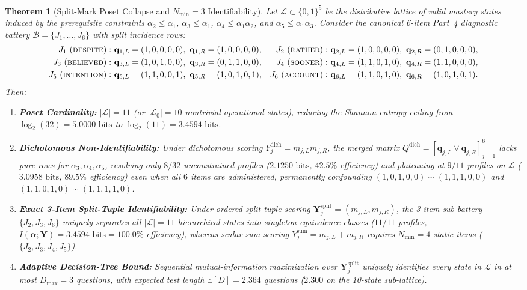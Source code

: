 \documentclass[11pt,reqno]{article}
\newtheorem{theorem}{Theorem}[section]
\begin{document}
\begin{theorem}[Split-Mark Poset Collapse and $N_{\min}=3$ Identifiability]\label{thm:poset}
Let $\mathcal{L} \subset \{0,1\}^5$ be the distributive lattice of valid mastery states induced by the prerequisite constraints $\alpha_2 \le \alpha_1$, $\alpha_3 \le \alpha_1$, $\alpha_4 \le \alpha_1\alpha_2$, and $\alpha_5 \le \alpha_1\alpha_3$. Consider the canonical 6-item Part~4 diagnostic battery $\mathcal{B} = \{J_1,\dots,J_6\}$ with split incidence rows:
\begin{align*}
J_1\ (\textsc{despite}): &\ \mathbf{q}_{1,L}=(1,0,0,0,0),\ \mathbf{q}_{1,R}=(1,0,0,0,0), &
J_2\ (\textsc{rather}):  &\ \mathbf{q}_{2,L}=(1,0,0,0,0),\ \mathbf{q}_{2,R}=(0,1,0,0,0), \\
J_3\ (\textsc{believed}):&\ \mathbf{q}_{3,L}=(1,0,1,0,0),\ \mathbf{q}_{3,R}=(0,1,1,0,0), &
J_4\ (\textsc{sooner}):  &\ \mathbf{q}_{4,L}=(1,1,0,1,0),\ \mathbf{q}_{4,R}=(1,1,0,0,0), \\
J_5\ (\textsc{intention}):&\ \mathbf{q}_{5,L}=(1,1,0,0,1),\ \mathbf{q}_{5,R}=(1,0,1,0,1), &
J_6\ (\textsc{account}): &\ \mathbf{q}_{6,L}=(1,1,0,1,0),\ \mathbf{q}_{6,R}=(1,0,1,0,1).
\end{align*}
Then:
\begin{enumerate}
    \item \textbf{Poset Cardinality:} $|\mathcal{L}| = 11$ (or $|\mathcal{L}_0| = 10$ nontrivial operational states), reducing the Shannon entropy ceiling from $\log_2(32) = 5.0000\text{ bits}$ to $\log_2(11) = 3.4594\text{ bits}$.
    \item \textbf{Dichotomous Non-Identifiability:} Under dichotomous scoring $Y_j^{\mathrm{dich}} = m_{j,L}m_{j,R}$, the merged matrix $Q^{\mathrm{dich}} = [\mathbf{q}_{j,L}\vee\mathbf{q}_{j,R}]_{j=1}^6$ lacks pure rows for $\alpha_3, \alpha_4, \alpha_5$, resolving only $8/32$ unconstrained profiles ($2.1250\text{ bits}$, $42.5\%$ efficiency) and plateauing at $9/11$ profiles on $\mathcal{L}$ ($3.0958\text{ bits}$, $89.5\%$ efficiency) even when all $6$ items are administered, permanently confounding $(1,0,1,0,0) \sim (1,1,1,0,0)$ and $(1,1,0,1,0) \sim (1,1,1,1,0)$.
    \item \textbf{Exact 3-Item Split-Tuple Identifiability:} Under ordered split-tuple scoring $\mathbf{Y}_j^{\mathrm{split}} = (m_{j,L}, m_{j,R})$, the 3-item sub-battery $\{J_2, J_3, J_6\}$ uniquely separates all $|\mathcal{L}| = 11$ hierarchical states into singleton equivalence classes ($11/11$ profiles, $I(\boldsymbol{\alpha}; \mathbf{Y}) = 3.4594\text{ bits} = 100.0\%$ efficiency), whereas scalar sum scoring $Y_j^{\mathrm{sum}} = m_{j,L}+m_{j,R}$ requires $N_{\min} = 4$ static items ($\{J_2, J_3, J_4, J_5\}$).
    \item \textbf{Adaptive Decision-Tree Bound:} Sequential mutual-information maximization over $\mathbf{Y}_j^{\mathrm{split}}$ uniquely identifies every state in $\mathcal{L}$ in at most $D_{\max} = 3$ questions, with expected test length $\mathbb{E}[D] = 2.364$ questions ($2.300$ on the 10-state sub-lattice).
\end{enumerate}
\end{theorem}
\end{document}
